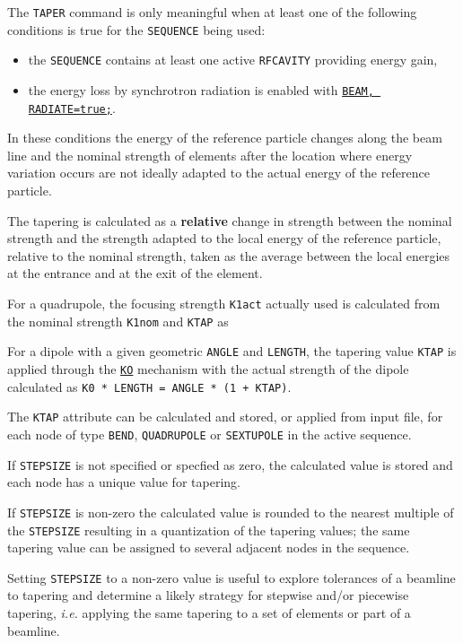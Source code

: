 The \texttt{TAPER} command is only meaningful when at least one of the
following conditions is true for the \texttt{SEQUENCE} being used:
\begin{itemize}
  \item the \texttt{SEQUENCE} contains at least one active
    \texttt{RFCAVITY} providing energy gain, 
  \item the energy loss by synchrotron radiation is enabled with
    \hyperref[sec:beam]{\texttt{BEAM, RADIATE=true;}}. 
\end{itemize}
In these conditions the energy of the reference particle changes along
the beam line and the nominal strength of elements after the location
where energy variation occurs are not ideally adapted to the actual
energy of the reference particle. 

The tapering is calculated as a \textbf{relative} change in strength
between the nominal strength and the strength adapted to the local
energy of the reference particle, relative to the nominal strength,
taken as the average between the local energies at the entrance and at
the exit of the element. 

For a quadrupole, the focusing strength \texttt{K1act}
actually used is calculated from the nominal strength \texttt{K1nom} and 
\texttt{KTAP} as 

For a dipole with a given geometric \texttt{ANGLE} and \texttt{LENGTH},
the tapering value \texttt{KTAP} is applied through the
\hyperref[sec:bend]{\texttt{KO}} mechanism with the actual strength of
the dipole calculated as \texttt{K0 * LENGTH = ANGLE * (1 + KTAP)}.

The \texttt{KTAP} attribute can be calculated and stored, or applied
from input file, for each node of type \texttt{BEND},
\texttt{QUADRUPOLE} or \texttt{SEXTUPOLE} in the active sequence. 

If \texttt{STEPSIZE} is not specified or specfied as zero, the
calculated value is stored and each node has a unique value 
for tapering.

If \texttt{STEPSIZE} is non-zero the calculated value is rounded to the
nearest multiple of the \texttt{STEPSIZE} resulting in a quantization of
the tapering values; the same tapering value can be assigned to several
adjacent nodes in the sequence.

Setting \texttt{STEPSIZE} to a non-zero value is useful to explore tolerances of a
beamline to tapering and determine a likely strategy for stepwise and/or piecewise
tapering, {\it i.e.} applying the same tapering to a set of elements or
part of a beamline.

